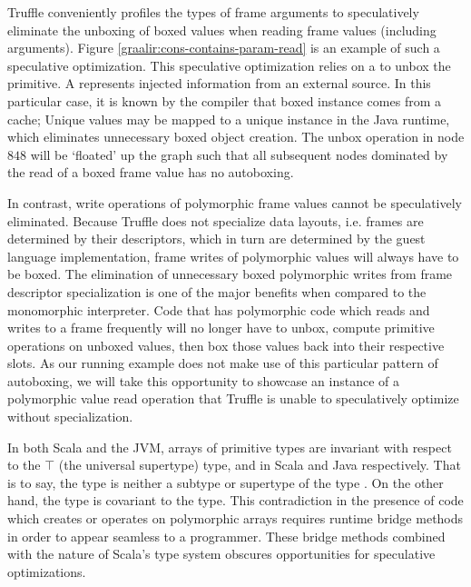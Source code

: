 Truffle conveniently profiles the types of frame arguments to speculatively eliminate the unboxing of boxed values when reading frame values (including arguments).
Figure \ref{graalir:cons-contains-param-read} is an example of such a speculative optimization.
This speculative optimization relies on a  to unbox the primitive.
A  represents injected information from an external source.
In this particular case, it is known by the compiler that boxed instance comes from a cache; Unique  values may be mapped to a unique  instance in the Java runtime, which eliminates unnecessary boxed object creation.
The unbox operation in node $848$ will be `floated' up the graph such that all subsequent nodes dominated by the read of a boxed frame value has no autoboxing.

In contrast, write operations of polymorphic frame values cannot be speculatively eliminated. 
Because Truffle does not specialize data layouts, i.e. frames are determined by their descriptors, which in turn are determined by the guest language implementation, frame writes of polymorphic values will always have to be boxed.
The elimination of unnecessary boxed polymorphic writes from frame descriptor specialization is one of the major benefits when compared to the monomorphic interpreter.
Code that has polymorphic code which reads and writes to a frame frequently will no longer have to unbox, compute primitive operations on unboxed values, then box those values back into their respective slots.
As our running example does not make use of this particular pattern of autoboxing, we will take this opportunity to showcase an instance of a polymorphic value read operation that Truffle is unable to speculatively optimize without specialization.

In both Scala and the JVM, arrays of primitive types are invariant with respect to the $\top$ (the universal supertype) type,  and  in Scala and Java respectively.
That is to say, the type  is neither a subtype or supertype of the type .
On the other hand, the type  is covariant to the  type.
This contradiction in the presence of code which creates or operates on polymorphic arrays requires runtime bridge methods in order to appear seamless to a programmer.
These bridge methods combined with the nature of Scala's type system obscures opportunities for speculative optimizations.

